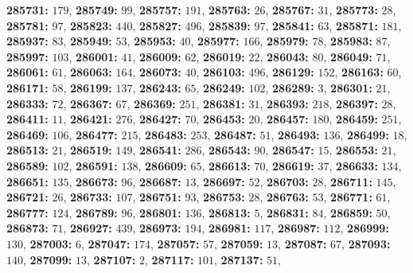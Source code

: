 \textsf{\bfseries 285731:} $179$, \textsf{\bfseries 285749:} $99$, \textsf{\bfseries 285757:} $191$, \textsf{\bfseries 285763:} $26$, \textsf{\bfseries 285767:} $31$, \textsf{\bfseries 285773:} $28$, \textsf{\bfseries 285781:} $97$, \textsf{\bfseries 285823:} $440$, \textsf{\bfseries 285827:} $496$, \textsf{\bfseries 285839:} $97$, \textsf{\bfseries 285841:} $63$, \textsf{\bfseries 285871:} $181$, \textsf{\bfseries 285937:} $83$, \textsf{\bfseries 285949:} $53$, \textsf{\bfseries 285953:} $40$, \textsf{\bfseries 285977:} $166$, \textsf{\bfseries 285979:} $78$, \textsf{\bfseries 285983:} $87$, \textsf{\bfseries 285997:} $103$, \textsf{\bfseries 286001:} $41$, \textsf{\bfseries 286009:} $62$, \textsf{\bfseries 286019:} $22$, \textsf{\bfseries 286043:} $80$, \textsf{\bfseries 286049:} $71$, \textsf{\bfseries 286061:} $61$, \textsf{\bfseries 286063:} $164$, \textsf{\bfseries 286073:} $40$, \textsf{\bfseries 286103:} $496$, \textsf{\bfseries 286129:} $152$, \textsf{\bfseries 286163:} $60$, \textsf{\bfseries 286171:} $58$, \textsf{\bfseries 286199:} $137$, \textsf{\bfseries 286243:} $65$, \textsf{\bfseries 286249:} $102$, \textsf{\bfseries 286289:} $3$, \textsf{\bfseries 286301:} $21$, \textsf{\bfseries 286333:} $72$, \textsf{\bfseries 286367:} $67$, \textsf{\bfseries 286369:} $251$, \textsf{\bfseries 286381:} $31$, \textsf{\bfseries 286393:} $218$, \textsf{\bfseries 286397:} $28$, \textsf{\bfseries 286411:} $11$, \textsf{\bfseries 286421:} $276$, \textsf{\bfseries 286427:} $70$, \textsf{\bfseries 286453:} $20$, \textsf{\bfseries 286457:} $180$, \textsf{\bfseries 286459:} $251$, \textsf{\bfseries 286469:} $106$, \textsf{\bfseries 286477:} $215$, \textsf{\bfseries 286483:} $253$, \textsf{\bfseries 286487:} $51$, \textsf{\bfseries 286493:} $136$, \textsf{\bfseries 286499:} $18$, \textsf{\bfseries 286513:} $21$, \textsf{\bfseries 286519:} $149$, \textsf{\bfseries 286541:} $286$, \textsf{\bfseries 286543:} $90$, \textsf{\bfseries 286547:} $15$, \textsf{\bfseries 286553:} $21$, \textsf{\bfseries 286589:} $102$, \textsf{\bfseries 286591:} $138$, \textsf{\bfseries 286609:} $65$, \textsf{\bfseries 286613:} $70$, \textsf{\bfseries 286619:} $37$, \textsf{\bfseries 286633:} $134$, \textsf{\bfseries 286651:} $135$, \textsf{\bfseries 286673:} $96$, \textsf{\bfseries 286687:} $13$, \textsf{\bfseries 286697:} $52$, \textsf{\bfseries 286703:} $28$, \textsf{\bfseries 286711:} $145$, \textsf{\bfseries 286721:} $26$, \textsf{\bfseries 286733:} $107$, \textsf{\bfseries 286751:} $93$, \textsf{\bfseries 286753:} $28$, \textsf{\bfseries 286763:} $53$, \textsf{\bfseries 286771:} $61$, \textsf{\bfseries 286777:} $124$, \textsf{\bfseries 286789:} $96$, \textsf{\bfseries 286801:} $136$, \textsf{\bfseries 286813:} $5$, \textsf{\bfseries 286831:} $84$, \textsf{\bfseries 286859:} $50$, \textsf{\bfseries 286873:} $71$, \textsf{\bfseries 286927:} $439$, \textsf{\bfseries 286973:} $194$, \textsf{\bfseries 286981:} $117$, \textsf{\bfseries 286987:} $112$, \textsf{\bfseries 286999:} $130$, \textsf{\bfseries 287003:} $6$, \textsf{\bfseries 287047:} $174$, \textsf{\bfseries 287057:} $57$, \textsf{\bfseries 287059:} $13$, \textsf{\bfseries 287087:} $67$, \textsf{\bfseries 287093:} $140$, \textsf{\bfseries 287099:} $13$, \textsf{\bfseries 287107:} $2$, \textsf{\bfseries 287117:} $101$, \textsf{\bfseries 287137:} $51$, 
